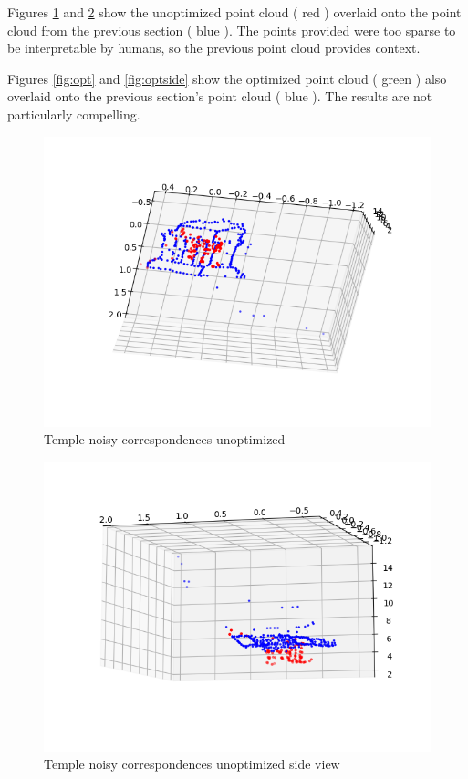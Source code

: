 \documentclass[12pt]{article}
\begin{document}
Figures \ref{fig:unopt} and \ref{fig:unoptside} show the unoptimized point cloud ( red ) overlaid onto the point cloud from the previous section ( blue  ). The points provided were too sparse to be interpretable by humans, so the previous point cloud provides context.

Figures \ref{fig:opt} and \ref{fig:optside} show the optimized point cloud ( green ) also overlaid onto the previous section's point cloud ( blue ). The results are not particularly compelling.

\begin{figure}[H]
\centering
\includegraphics[page=1,width=1\textwidth]{q5_3a}
\caption{Temple noisy correspondences unoptimized   } 
\label{fig:unopt}
\end{figure}   

\begin{figure}[H]
\centering
\includegraphics[page=1,width=1\textwidth]{q5_3b}
\caption{Temple noisy correspondences unoptimized side view } 
\label{fig:unoptside}
\end{figure}   
\end{document}
